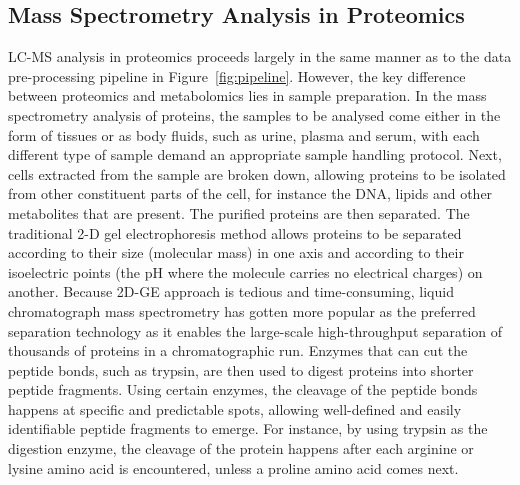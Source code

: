 
\subsection{Mass Spectrometry Analysis in Proteomics}

LC-MS analysis in proteomics proceeds largely in the same manner as to the data pre-processing pipeline in Figure~\ref{fig:pipeline}. However, the key difference between proteomics and metabolomics lies in sample preparation. In the mass spectrometry analysis of proteins, the samples to be analysed come either in the form of tissues or as body fluids, such as urine, plasma and serum, with each different type of sample demand an appropriate sample handling protocol. Next, cells extracted from the sample are broken down, allowing proteins to be isolated from other constituent parts of the cell, for instance the DNA, lipids and other metabolites that are present. The purified proteins are then separated. The traditional 2-D gel electrophoresis method allows proteins to be separated according to their size (molecular mass) in one axis and according to their isoelectric points (the pH where the molecule carries no electrical charges) on another. Because 2D-GE approach is tedious and time-consuming, liquid chromatograph mass spectrometry has gotten more popular as the preferred separation technology as it enables the large-scale high-throughput separation of thousands of proteins in a chromatographic run. Enzymes that can cut the peptide bonds, such as trypsin, are then used to digest proteins into shorter peptide fragments. Using certain enzymes, the cleavage of the peptide bonds happens at specific and predictable spots, allowing well-defined and easily identifiable peptide fragments to emerge. For instance, by using trypsin as the digestion enzyme, the cleavage of the protein happens after each arginine or lysine amino acid is encountered, unless a proline amino acid comes next. 

